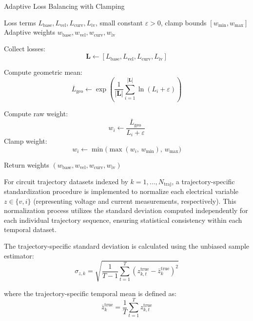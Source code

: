 \documentclass[11pt, oneside]{article}
\begin{document}
\begin{algorithm}[H]
    \caption{Adaptive Loss Balancing with Clamping}
    \label{alg:adaptive_loss_balancing}
    \begin{algorithmic}[1]
        \Require Loss terms $L_{\text{base}}, L_{\text{vel}}, L_{\text{curv}}, L_{\text{iv}}$, small constant $\varepsilon > 0$, clamp bounds $[w_{\min}, w_{\max}]$
        \Ensure Adaptive weights $w_{\text{base}}, w_{\text{vel}}, w_{\text{curv}}, w_{\text{iv}}$
        \Statex

        \State Collect losses:
        \[
            \mathbf{L} \gets [L_{\text{base}}, L_{\text{vel}}, L_{\text{curv}}, L_{\text{iv}}]
        \]

        \State Compute geometric mean:
        \[
            \overline{L}_{\text{geo}} \gets \exp\!\left(\frac{1}{|\mathbf{L}|} \sum_{i=1}^{|\mathbf{L}|} \ln(L_i + \varepsilon)\right)
        \]

        \State Compute raw weight:
        \[
            w_i \gets \frac{\overline{L}_{\text{geo}}}{L_i + \varepsilon}
        \]
        \State Clamp weight:
        \[
            w_i \gets \min\!\big(\max(w_i, \, w_{\min}), \, w_{\max}\big)
        \]
        \EndFor

        \State Return weights $(w_{\text{base}}, w_{\text{vel}}, w_{\text{curv}}, w_{\text{iv}})$
    \end{algorithmic}
\end{algorithm}



For circuit trajectory datasets indexed by $k = 1, \ldots, N_{\text{traj}}$, a trajectory-specific standardization procedure is implemented to normalize each electrical variable $z \in \{v, i\}$ (representing voltage and current measurements, respectively). This normalization process utilizes the standard deviation computed independently for each individual trajectory sequence, ensuring statistical consistency within each temporal dataset.

The trajectory-specific standard deviation is calculated using the unbiased sample estimator:
\begin{equation}
    \sigma_{z,k} = \sqrt{\frac{1}{T-1} \sum_{t=1}^{T} \left(z_{k,t}^{\mathrm{true}} - \bar{z}_k^{\mathrm{true}}\right)^2}
\end{equation}

where the trajectory-specific temporal mean is defined as:
\begin{equation}
    \bar{z}_k^{\mathrm{true}} = \frac{1}{T} \sum_{t=1}^{T} z_{k,t}^{\mathrm{true}}
\end{equation}
\end{document}
